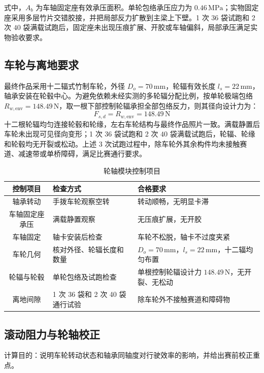 \documentclass[UTF8,a4paper,12pt,fontset=none]{ctexart}
\numberwithin{equation}{section}
\numberwithin{figure}{section}
\numberwithin{table}{section}
\newcommand{\mm}{\,\mathrm{mm}}
\newcommand{\Nunit}{\,\mathrm{N}}
\newcommand{\MPa}{\,\mathrm{MPa}}
\begin{document}
式中，$A_b$ 为车轴固定座有效承压面积。单轮包络承压应力为 $0.46\MPa$；实物固定座采用多层竹片交错胶接，并把局部反力扩散到主梁上下壁。1 次 $36$ 袋试跑和 2 次 $40$ 袋满载试跑后，固定座未出现压痕扩展、开胶或车轴偏斜，局部承压满足实物验收要求。

\subsection{车轮与离地要求}
最终作品采用十二辐式竹制车轮，外径 $D_o=70\mm$，轮辐有效长度 $l_s=22\mm$，轴承安装在轮毂中心。为避免依赖未经实测的多轮辐分配比例，按单轮极端包络 $R_{w,\mathrm{env}}=148.49\Nunit$，取一根下部控制轮辐承担全部包络反力，则其径向设计力为：
\begin{equation}
  F_{s,d}=R_{w,\mathrm{env}}=148.49\Nunit
\end{equation}
十二根轮辐均匀连接轮毂和轮缘，左右车轮结构与最终作品照片一致。满载静置后车轮未出现可见径向变形；1 次 $36$ 袋试跑和 2 次 $40$ 袋满载试跑后，轮辐、轮缘和轮毂均无开裂或松动。上述 3 次试跑过程中，除车轮外其余构件均未接触赛道、减速带或单桥障碍，满足比赛通行要求。

\begin{table}[H]
\centering
\caption{轮轴模块控制项目}
\label{tab:wheel-control}
\begin{tabularx}{\linewidth}{cY Y}
\toprule
\textbf{控制项目} & \textbf{检查方式} & \textbf{合格要求} \\\midrule
轴承转动 & 手拨车轮观察空转 & 转动顺畅，无明显卡滞 \\
车轴固定座承压 & 满载静置观察 & 无压痕扩展，无开胶 \\
车轴固定 & 轴卡安装后检查 & 车轮不松脱，轴卡不过度夹紧 \\
车轮几何 & 核对外径、轮辐长度和数量 & $D_o=70\mm$，$l_s=22\mm$，十二辐均匀布置 \\
轮辐与轮毂 & 单轮包络及试跑检查 & 单根控制轮辐设计力 $148.49\Nunit$，无开裂、无松动 \\
离地间隙 & 1 次 36 袋和 2 次 40 袋通行试验 & 除车轮外不接触赛道和障碍物 \\
\bottomrule
\end{tabularx}
\end{table}

\newpage
\subsection{滚动阻力与轮轴校正}
计算目的：说明车轮转动状态和轴承同轴度对行驶效率的影响，并给出赛前校正重点。
\end{document}
